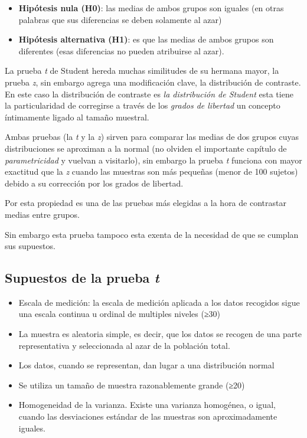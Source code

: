 \documentclass[
]{book}
\begin{document}
\begin{itemize}
\item
  \textbf{Hipótesis nula (H0)}: las medias de ambos grupos son iguales (en otras palabras que sus diferencias se deben solamente al azar)
\item
  \textbf{Hipótesis alternativa (H1)}: es que las medias de ambos grupos son diferentes (esas diferencias no pueden atribuirse al azar).
\end{itemize}

La prueba \emph{t} de Student hereda muchas similitudes de su hermana mayor, la prueba \emph{z}, sin embargo agrega una modificación clave, la distribución de contraste. En este caso la distribución de contraste es \emph{la distribución de Student} esta tiene la particularidad de corregirse a través de los \emph{grados de libertad} un concepto íntimamente ligado al tamaño muestral.

Ambas pruebas (la \emph{t} y la \emph{z}) sirven para comparar las medias de dos grupos cuyas distribuciones se aproximan a la normal (no olviden el importante capítulo de \emph{parametricidad} y vuelvan a visitarlo), sin embargo la prueba \emph{t} funciona con mayor exactitud que la \emph{z} cuando las muestras son más pequeñas (menor de 100 sujetos) debido a su corrección por los grados de libertad.

Por esta propiedad es una de las pruebas más elegidas a la hora de contrastar medias entre grupos.

Sin embargo esta prueba tampoco esta exenta de la necesidad de que se cumplan sus supuestos.

\hypertarget{supuestos-de-la-prueba-t}{%
\subsection{\texorpdfstring{Supuestos de la prueba \emph{t}}{Supuestos de la prueba t}}\label{supuestos-de-la-prueba-t}}

\begin{itemize}
\item
  Escala de medición: la escala de medición aplicada a los datos recogidos sigue una escala continua u ordinal de multiples niveles (≥30)
\item
  La muestra es aleatoria simple, es decir, que los datos se recogen de una parte representativa y seleccionada al azar de la población total.
\item
  Los datos, cuando se representan, dan lugar a una distribución normal
\item
  Se utiliza un tamaño de muestra razonablemente grande (≥20)
\item
  Homogeneidad de la varianza. Existe una varianza homogénea, o igual, cuando las desviaciones estándar de las muestras son aproximadamente iguales.
\end{itemize}
\end{document}
